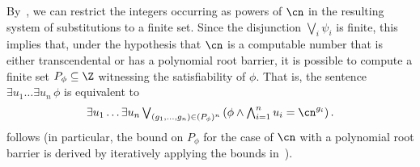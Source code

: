 By~, we can restrict the integers occurring 
as powers of $\cn$ in the resulting system of substitutions to a finite set.
Since the disjunction $\bigvee_i \psi_i$ is finite, 
this implies that,
under the hypothesis that $\cn$ is a computable number that is either transcendental or has a polynomial root barrier, 
it is possible to compute a finite set $P_{\phi} \subseteq \Z$ witnessing the satisfiability of $\phi$. That is, the sentence $\exists u_1\dots \exists u_n\, \phi$ is equivalent to
\[ 
  \exists u_1 \dots \exists u_n \textstyle\bigvee_{(g_1,\dots,g_n) \in (P_{\phi})^n} \textstyle\left(\phi \land \bigwedge_{i=1}^n u_i = \cn^{g_i}\right).
\]
 follows (in particular, the bound on $P_{\phi}$ 
for the case of $\cn$ with a polynomial root barrier is derived 
by iteratively applying the bounds in~).



